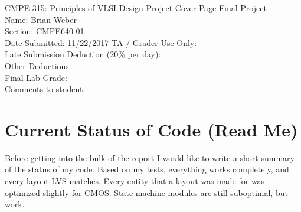 \documentclass[10pt]{article}
\begin{document}
\begin{titlepage}
\centering
\huge{CMPE 315: Principles of VLSI Design Project Cover Page}
\vfill
\flushleft
\large{
Final Project\\
}
\vfill
Name: Brian Weber\\
Section: CMPE640 01\\
\vfill
Date Submitted: 11/22/2017
\vfill
\Large{TA / Grader Use Only:}\\
Late Submission Deduction (20\% per day):\\
\vspace{1cm}
Other Deductions:\\
\vspace{3cm}
Final Lab Grade:\\
\vspace{1cm}
Comments to student:\\
\vspace{5cm}
\end{titlepage}
\tableofcontents
    \section{Current Status of Code (Read Me)}
        Before getting into the bulk of the report I would like to write a short
summary of the status of my code. Based on my tests, everything works
completely, and every layout LVS matches. Every entity that a layout was made
for was optimized slightly for CMOS. State machine modules are still suboptimal,
but work.
\end{document}

